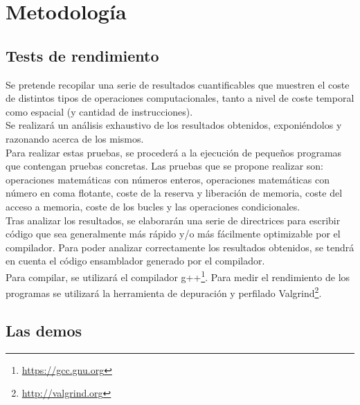 
\chapter{Metodología}

\section{Tests de rendimiento}

Se pretende recopilar una serie de resultados cuantificables que muestren el coste de distintos tipos de operaciones computacionales, tanto a nivel de coste temporal como espacial (y cantidad de instrucciones).\\

Se realizará un análisis exhaustivo de los resultados obtenidos, exponiéndolos y razonando acerca de los mismos.\\

Para realizar estas pruebas, se procederá a la ejecución de pequeños programas que contengan pruebas concretas. Las pruebas que se propone realizar son: operaciones matemáticas con números enteros, operaciones matemáticas con número en coma flotante, coste de la reserva y liberación de memoria, coste del acceso a memoria, coste de los bucles y las operaciones condicionales.\\

Tras analizar los resultados, se elaborarán una serie de directrices para escribir código que sea generalmente más rápido y/o más fácilmente optimizable por el compilador. Para poder analizar correctamente los resultados obtenidos, se tendrá en cuenta el código ensamblador generado por el compilador.\\

Para compilar, se utilizará el compilador g++\footnote{\url{https://gcc.gnu.org}}. Para medir el rendimiento de los programas se utilizará la herramienta de depuración y perfilado Valgrind\footnote{\url{http://valgrind.org}}.

\section{Las demos}

